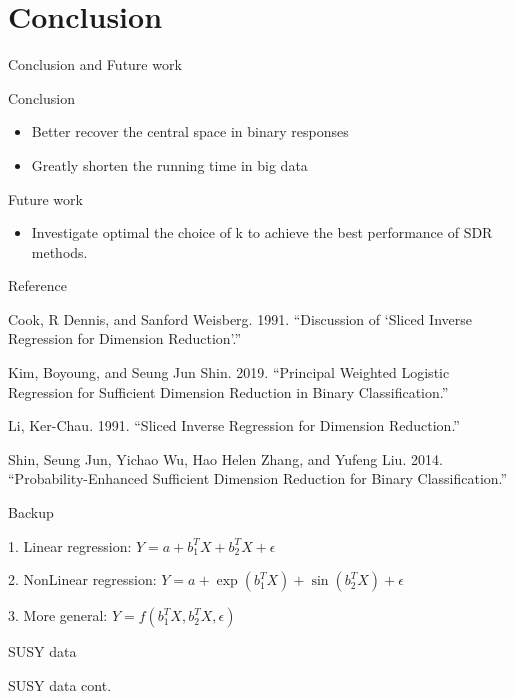 \documentclass[ignorenonframetext,]{beamer}
\providecommand{\tightlist}{%
  \setlength{\itemsep}{0pt}\setlength{\parskip}{0pt}}
\begin{document}
\section{Conclusion}\label{conclusion}

\begin{frame}{Conclusion and Future work}

\begin{block}{Conclusion}

\begin{itemize}
\tightlist
\item
  Better recover the central space in binary responses
\item
  Greatly shorten the running time in big data
\end{itemize}

\end{block}

\begin{block}{Future work}

\begin{itemize}
\tightlist
\item
  Investigate optimal the choice of k to achieve the best performance of
  SDR methods.
\end{itemize}

\end{block}

\end{frame}

\begin{frame}{Reference}

\hypertarget{refs}{}
\hypertarget{ref-ref7}{}
Cook, R Dennis, and Sanford Weisberg. 1991. ``Discussion of `Sliced
Inverse Regression for Dimension Reduction'.''

\hypertarget{ref-ref9}{}
Kim, Boyoung, and Seung Jun Shin. 2019. ``Principal Weighted Logistic
Regression for Sufficient Dimension Reduction in Binary
Classification.''

\hypertarget{ref-ref6}{}
Li, Ker-Chau. 1991. ``Sliced Inverse Regression for Dimension
Reduction.''

\hypertarget{ref-ref8}{}
Shin, Seung Jun, Yichao Wu, Hao Helen Zhang, and Yufeng Liu. 2014.
``Probability-Enhanced Sufficient Dimension Reduction for Binary
Classification.''

\end{frame}

\begin{frame}{Backup}

\begin{examples}

1. Linear regression: $Y = a + b_1^TX + b_2^TX + \epsilon$

2. NonLinear regression: $Y = a + \exp(b_1^TX) + \sin(b_2^TX) + \epsilon$

3. More general: $Y = f(b_1^TX, b_2^TX, \epsilon)$
\end{examples}

\end{frame}

\begin{frame}{SUSY data}

\end{frame}

\begin{frame}{SUSY data cont.}

\end{frame}
\end{document}
